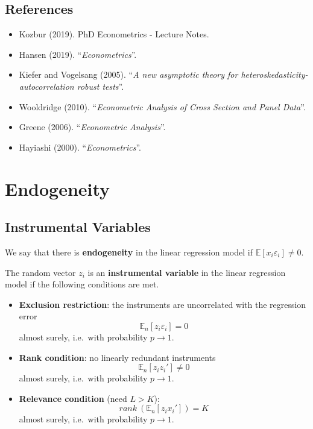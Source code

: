 \documentclass[12pt,]{book}
\providecommand{\tightlist}{%
  \setlength{\itemsep}{0pt}\setlength{\parskip}{0pt}}
\begin{document}
\hypertarget{references-5}{%
\section{References}\label{references-5}}

\begin{itemize}
\tightlist
\item
  Kozbur (2019). PhD Econometrics - Lecture Notes.
\item
  Hansen (2019). ``\emph{Econometrics}''.
\item
  Kiefer and Vogelsang (2005). ``\emph{A new asymptotic theory for heteroskedasticity-autocorrelation robust tests}''.
\item
  Wooldridge (2010). ``\emph{Econometric Analysis of Cross Section and Panel Data}''.
\item
  Greene (2006). ``\emph{Econometric Analysis}''.
\item
  Hayiashi (2000). ``\emph{Econometrics}''.
\end{itemize}

\hypertarget{lecture3}{%
\chapter{Endogeneity}\label{lecture3}}

\hypertarget{instrumental-variables}{%
\section{Instrumental Variables}\label{instrumental-variables}}

We say that there is \textbf{endogeneity} in the linear regression model if \(\mathbb E[x_i \varepsilon_i] \neq 0\).

The random vector \(z_i\) is an \textbf{instrumental variable} in the linear regression model if the following conditions are met.

\begin{itemize}
\tightlist
\item
  \textbf{Exclusion restriction}: the instruments are uncorrelated with the regression error
  \[
    \mathbb E_n[z_i \varepsilon_i] = 0 
  \]
  almost surely, i.e.~with probability \(p \to 1\).
\item
  \textbf{Rank condition}: no linearly redundant instruments
  \[ 
    \mathbb E_n[z_i z_i'] \neq 0 
  \]
  almost surely, i.e.~with probability \(p \to 1\).
\item
  \textbf{Relevance condition} (need \(L > K\)):
  \[
    rank \ (\mathbb E_n[z_i x_i']) = K
  \]
  almost surely, i.e.~with probability \(p \to 1\).
\end{itemize}
\end{document}
